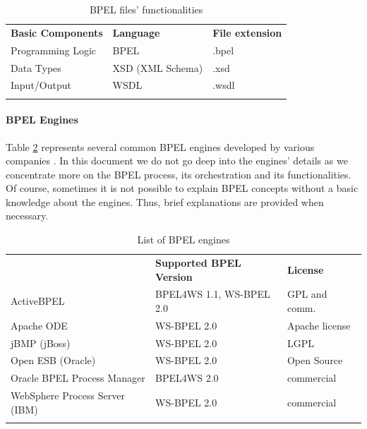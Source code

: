 \begin{table}[h!]
\caption{BPEL files' functionalities}
\label{BPELfilesTable}
\begin{center}
\begin{tabular}{l l l}
						\toprule
						\addlinespace[0.2cm]
\textbf{Basic Components} 	& \textbf{Language} 	& \textbf{File extension} 	\\ 
						\cmidrule(l){1-3}
Programming Logic 		& BPEL			& .bpel 			\\[0,1cm]
Data Types 			& XSD (XML Schema) 	& .xsd 				\\[0,1cm]
Input/Output 			& WSDL 			& .wsdl 			\\[0,1cm]
						\addlinespace[0.2cm]
						\bottomrule
\end{tabular}
\end{center}
\end{table}


\paragraph{BPEL Engines}
Table \ref{BPELengines} represents several common BPEL engines developed by various companies \cite{BPELenginesComparisonOnWikipedia}. In this document we do not go deep into the engines' details as we concentrate more on the BPEL process, its orchestration and its functionalities. Of course, sometimes it is not possible to explain BPEL concepts without a basic knowledge about the engines. Thus, brief explanations are provided when necessary.


\begin{table}
\caption{List of BPEL engines}
\label{BPELengines}
\begin{center}
\begin{tabular}{l l l}  %
						\toprule
						\addlinespace[0.2cm]
{\bf Name of BPEL Engine} 	& {\bf Supported BPEL Version} 	& {\bf License} 	\\
						\cmidrule(l){1-3}
ActiveBPEL         		& BPEL4WS 1.1, WS-BPEL 2.0 	& GPL and comm. 	\\[0,1cm]
Apache ODE         		& WS-BPEL 2.0 			& Apache license	\\[0,1cm]
jBMP (jBoss)         		& WS-BPEL 2.0 			& LGPL			\\[0,1cm]
Open ESB (Oracle)		& WS-BPEL 2.0 			& Open Source		\\[0,1cm] 
Oracle BPEL Process Manager   	& BPEL4WS 2.0 			& commercial		\\[0,1cm]
WebSphere Process Server (IBM)	& WS-BPEL 2.0			& commercial		\\[0,1cm]
						\addlinespace[0.2cm]
						\bottomrule
\end{tabular}
\end{center}
\end{table}
